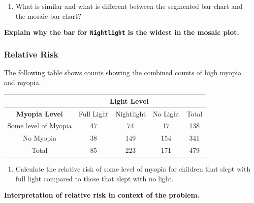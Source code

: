 \documentclass[
]{report}
\providecommand{\tightlist}{%
  \setlength{\itemsep}{0pt}\setlength{\parskip}{0pt}}
\begin{document}
\begin{enumerate}
\def\labelenumi{\arabic{enumi}.}
\setcounter{enumi}{7}
\tightlist
\item
  What is similar and what is different between the segmented bar chart and the mosaic bar chart?
\end{enumerate}

\vspace{1in}

\textbf{Explain why the bar for \texttt{Nightlight} is the widest in the mosaic plot.}

\vspace{0.8in}

\subsubsection*{Relative Risk}\label{relative-risk}

The following table shows counts showing the combined counts of high myopia and myopia.

\begin{center}
\begingroup
\setlength{\tabcolsep}{14pt} %
\renewcommand{\arraystretch}{2} %
\begin{tabular}{|c|c|c|c|c|}
\hline
 & \multicolumn{3}{|c|}{\textbf{Light Level}} & \\ \hline
\textbf{Myopia Level} & Full Light & Nightlight & No Light & Total \\ \hline
 Some level of Myopia & 47 & 74 & 17 & 138 \\ \hline
 No Myopia & 38 & 149 & 154 & 341 \\ \hline
 Total & 85 & 223 & 171 & 479 \\ \hline  
\end{tabular}
\endgroup
\end{center}

\begin{enumerate}
\def\labelenumi{\arabic{enumi}.}
\setcounter{enumi}{8}
\tightlist
\item
  Calculate the relative risk of some level of myopia for children that slept with full light compared to those that slept with no light.
\end{enumerate}

\vspace{0.8in}

\textbf{Interpretation of relative risk in context of the problem.}
\end{document}
